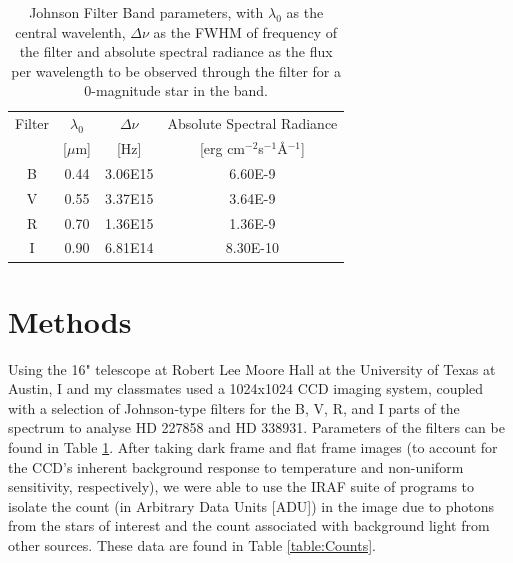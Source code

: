 \documentclass{article}
\begin{document}
\begin{table}
\begin{center}
\begin{tabular}{c | c | c | c}
Filter & $\lambda_0$ & $\Delta\nu$ & Absolute Spectral Radiance  \\
 & [$\mu$m]& [Hz]& [erg cm$^{-2}$s$^{-1}$\AA$^{-1}$] \\
\hline
B & 0.44 & 3.06E15 & 6.60E-9 \\
V & 0.55& 3.37E15 &3.64E-9 \\
R & 0.70& 1.36E15 &1.36E-9 \\
I & 0.90& 6.81E14&8.30E-10
\end{tabular}
\end{center}
\caption{Johnson Filter Band parameters, with $\lambda_0$ as the central wavelenth,
$\Delta\nu$ as the FWHM of frequency of the filter and absolute spectral radiance as the
flux per wavelength to be observed through the filter for a 0-magnitude star in the band.}
\label{table:filters}
\end{table}

\section{Methods}
Using the 16" telescope at Robert Lee Moore Hall at the University of Texas at Austin, I and my classmates used a 1024x1024 CCD imaging
system, coupled with a selection of Johnson-type filters for the B, V, R, and I parts of the spectrum to analyse HD 227858 and HD 338931. Parameters of the filters can be found in Table
\ref{table:filters}. After taking dark frame and flat frame images (to account for the CCD's inherent background response to temperature and
non-uniform sensitivity, respectively), we were able to use the IRAF suite of programs to isolate the count (in Arbitrary Data Units [ADU])
in the image due to photons from the stars of interest and the count associated with background light from other sources. These data
are found in Table \ref{table:Counts}.
\end{document}
